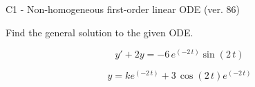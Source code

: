 \begin{exercise}
  \begin{exerciseTitle}C1 - Non-homogeneous first-order linear ODE (ver. 86)\end{exerciseTitle}
  \begin{exerciseStatement}
    
Find the general solution to the given ODE.

    
\[y'+2y= -6 \, e^{\left(-2 \, t\right)} \sin\left(2 \, t\right)\]

  \end{exerciseStatement}
  \begin{exerciseAnswer}
    
\[y= k e^{\left(-2 \, t\right)} + 3 \, \cos\left(2 \, t\right) e^{\left(-2 \, t\right)}\]

  \end{exerciseAnswer}
\end{exercise}